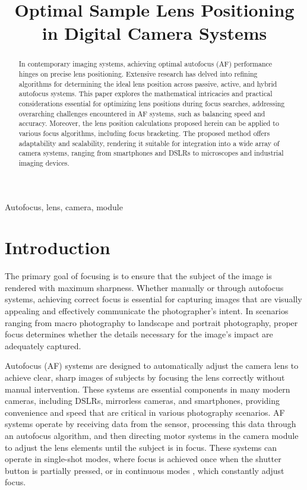 \documentclass{article}
\title{Optimal Sample Lens Positioning in Digital Camera Systems}
\begin{document}
%
\maketitle
%
\begin{abstract}
In contemporary imaging systems, achieving optimal autofocus (AF) performance hinges on precise lens positioning. Extensive research has delved into refining algorithms for determining the ideal lens position across passive, active, and hybrid autofocus systems. This paper explores the mathematical intricacies and practical considerations essential for optimizing lens positions during focus searches, addressing overarching challenges encountered in AF systems, such as balancing speed and accuracy. Moreover, the lens position calculations proposed herein can be applied to various focus algorithms, including focus bracketing. The proposed method offers adaptability and scalability, rendering it suitable for integration into a wide array of camera systems, ranging from smartphones and DSLRs to microscopes and industrial imaging devices.
\end{abstract}
%
\begin{keywords}
Autofocus, lens, camera, module
\end{keywords}
%
\section{Introduction}
\label{sec:intro}

The primary goal of focusing is to ensure that the subject of the image is rendered with maximum sharpness. Whether manually or through autofocus systems, achieving correct focus is essential for capturing images that are visually appealing and effectively communicate the photographer's intent. In scenarios ranging from macro photography to landscape and portrait photography, proper focus determines whether the details necessary for the image's impact are adequately captured.

Autofocus (AF) systems are designed to automatically adjust the camera lens to achieve clear, sharp images of subjects by focusing the lens correctly without manual intervention. These systems are essential components in many modern cameras, including DSLRs, mirrorless cameras, and smartphones, providing convenience and speed that are critical in various photography scenarios. AF systems operate by receiving data from the  sensor, processing this data through an autofocus algorithm, and then directing motor systems in the camera module to adjust the lens elements until the subject is in focus. These systems can operate in single-shot modes, where focus is achieved once when the shutter button is partially pressed, or in continuous modes \cite{Gamadia2006}, which constantly adjust focus.
\end{document}
